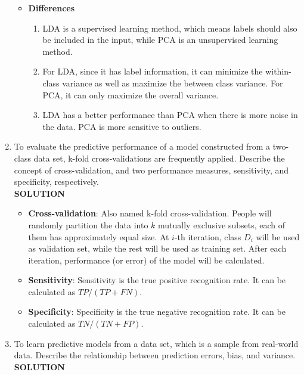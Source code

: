 \documentclass{article}
\begin{document}
\begin{enumerate}
\begin{itemize}
        \item \textbf{Differences}
        \begin{enumerate}
            \item LDA is a supervised learning method, which means labels should also be included in the input, while PCA is an unsupervised learning method.
            \item For LDA, since it has label information, it can minimize the within-class variance as well as maximize the between class variance. For PCA, it can only maximize the overall variance.
            \item LDA has a better performance than PCA when there is more noise in the data. PCA is more sensitive to outliers.
        \end{enumerate}
    \end{itemize}
    \item To evaluate the predictive performance of a model constructed from a two-class data set, k-fold cross-validations are frequently applied. Describe the concept of cross-validation, and two performance measures, sensitivity, and specificity, respectively.\\
    \textbf{SOLUTION}
    \begin{itemize}
        \item \textbf{Cross-validation}: Also named k-fold cross-validation. People will randomly partition the data into $k$ mutually exclusive subsets, each of them has approximately equal size. At $i$-th iteration, class $D_i$ will be used as validation set, while the rest will be used as training set. After each iteration, performance (or error) of the model will be calculated. 
        \item \textbf{Sensitivity}: Sensitivity is the true positive recognition rate. It can be calculated as $TP/(TP+FN)$.
        \item \textbf{Specificity}: Specificity is the true negative recognition rate. It can be calculated as $TN/(TN+FP)$.
    \end{itemize}
    \item To learn predictive models from a data set, which is a sample from real-world data. Describe the relationship between prediction errors, bias, and variance.\\
    \textbf{SOLUTION}\\

\end{enumerate}
\end{document}
